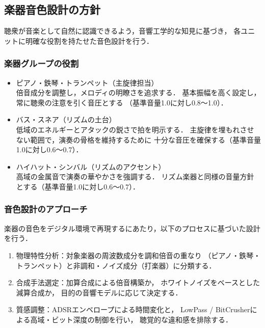 \subsection{楽器音色設計の方針}

聴衆が音楽として自然に認識できるよう，音響工学的な知見に基づき，
各ユニットに明確な役割を持たせた音色設計を行う．

\subsubsection*{楽器グループの役割}
\begin{itemize}
  \item ピアノ・鉄琴・トランペット（主旋律担当）\\
  倍音成分を調整し，メロディの明瞭さを追求する．
  基本振幅を高く設定し，常に聴衆の注意を引く音圧とする
  （基準音量1.0に対し0.8〜1.0）．

  \item バス・スネア（リズムの土台）\\
  低域のエネルギーとアタックの鋭さで拍を明示する．
  主旋律を埋もれさせない範囲で，演奏の骨格を維持するために
  十分な音圧を確保する（基準音量1.0に対し0.6〜0.7）．

  \item ハイハット・シンバル（リズムのアクセント）\\
  高域の金属音で演奏の華やかさを強調する．
  リズム楽器と同様の音量方針とする（基準音量1.0に対し0.6〜0.7）．
\end{itemize}

\subsubsection*{音色設計のアプローチ}
楽器の音色をデジタル環境で再現するにあたり，以下のプロセスに基づいた設計を行う．

\begin{enumerate}
  \item 物理特性分析：対象楽器の周波数成分を調和倍音の重なり
  （ピアノ・鉄琴・トランペット）と非調和・ノイズ成分（打楽器）に分類する．

  \item 合成手法選定：加算合成による倍音構築か，
  ホワイトノイズをベースとした減算合成か，
  目的の音響モデルに応じて決定する．

  \item 質感調整：ADSRエンベロープによる時間変化と，
  LowPass / BitCrusherによる高域・ビット深度の制御を行い，
  聴覚的な違和感を排除する．
\end{enumerate}

